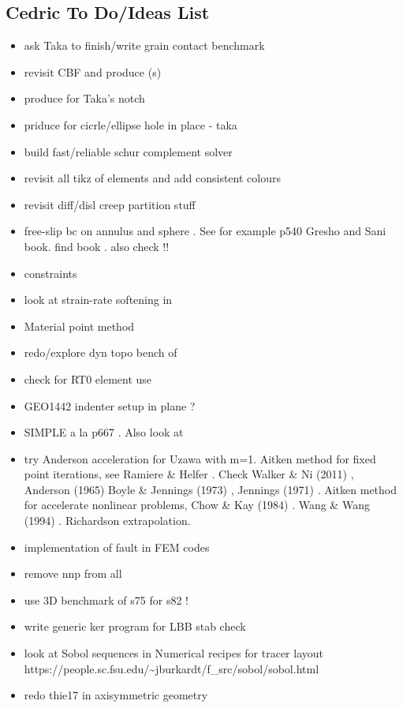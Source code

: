 \subsection{Cedric To Do/Ideas List}

\begin{itemize}
\item ask Taka to finish/write grain contact benchmark
\item revisit CBF and produce \stone(s)
\item produce \stone for Taka's notch
\item priduce \stone for cicrle/ellipse hole in place - taka
\item build fast/reliable schur complement solver
\item revisit all tikz of elements and add consistent colours
\item revisit diff/disl creep partition stuff
\item free-slip bc on annulus and sphere . See for example p540 Gresho and Sani book. find book \cite{deab72}.
also check \cite{ensg82} !!
\item constraints \cite{absh79}
\item look at strain-rate softening in \cite{belz02}
\item Material point method \cite{sucs94,susc96,susp07}
\item redo/explore dyn topo bench of \cite{bore19}
\item check \cite{bufm19} for RT0 element use
\item GEO1442 indenter setup in plane ?
\item SIMPLE a la p667 \cite{john16}. Also look at \cite{vusb00} 
\item try Anderson acceleration for Uzawa \cite{hoow17} with m=1. Aitken method for 
fixed point iterations, see Ramiere \& Helfer \cite{rahe15}.
Check Walker \& Ni (2011) \cite{wani11}, Anderson (1965) \cite{ande65}
Boyle \& Jennings (1973) \cite{boje73}, Jennings (1971) \cite{jenn71}.
Aitken method for accelerate nonlinear problems, Chow \& Kay (1984) \cite{chka84}.
Wang \& Wang (1994) \cite{wawa94}. Richardson extrapolation. 
\item implementation of fault in FEM codes \cite{zhgu94,zhgu95}
\item remove nnp from all \stones
\item use 3D benchmark of s75 for s82 !
\item write generic ker program for LBB stab check
\item look at Sobol sequences in Numerical recipes for tracer layout\\
https://people.sc.fsu.edu/\~{}jburkardt/f\_src/sobol/sobol.html
\item redo thie17 in axisymmetric geometry



\end{itemize}

